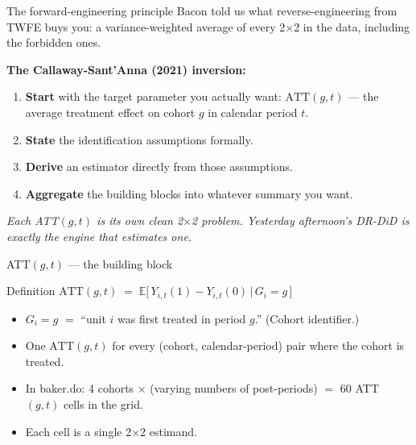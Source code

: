 \documentclass[aspectratio=169,11pt]{beamer}
\begin{document}
\begin{frame}{The forward-engineering principle}
\vspace{0.5em}
Bacon told us what reverse-engineering from TWFE buys you: \;a variance-weighted average of every 2$\times$2 in the data, including the forbidden ones.

\vspace{0.6em}
\textbf{The Callaway-Sant'Anna (2021) inversion:}
\begin{enumerate}\small
  \item \textbf{Start} with the target parameter you actually want: $\text{ATT}(g, t)$ --- the average treatment effect on cohort $g$ in calendar period $t$.
  \item \textbf{State} the identification assumptions formally.
  \item \textbf{Derive} an estimator directly from those assumptions.
  \item \textbf{Aggregate} the building blocks into whatever summary you want.
\end{enumerate}

\vspace{0.6em}
\begin{center}
\small\color{warmgray}\itshape
Each ATT$(g,t)$ is its own clean 2$\times$2 problem. \;Yesterday afternoon's DR-DiD is exactly the engine that estimates one.
\end{center}
\end{frame}

\begin{frame}{ATT$(g,t)$ --- the building block}
\vspace{0.6em}
\begin{block}{Definition}
\centering
$\text{ATT}(g, t) \;=\; \mathbb{E}\big[\, Y_{i,t}(1) - Y_{i,t}(0) \,\big|\, G_i = g\,\big]$
\end{block}

\vspace{0.6em}
\begin{itemize}\small
  \item $G_i = g$ \;$=$\; ``unit $i$ was first treated in period $g$.'' \;(Cohort identifier.)
  \item One $\text{ATT}(g, t)$ for every (cohort, calendar-period) pair where the cohort is treated.
  \item In baker.do: 4 cohorts $\times$ (varying numbers of post-periods) $=$ 60 ATT$(g,t)$ cells in the grid.
  \item Each cell is a single 2$\times$2 estimand. \;
\end{itemize}
\end{frame}
\end{document}
